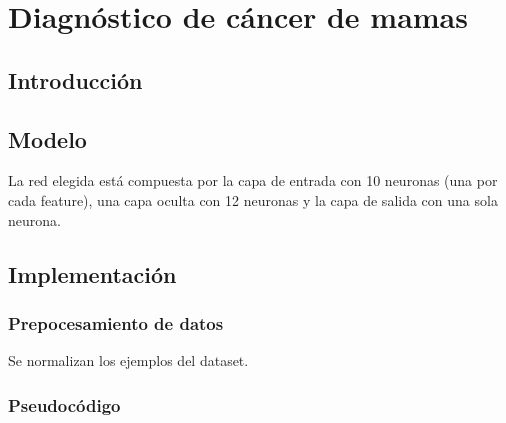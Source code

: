 \section{Diagnóstico de cáncer de mamas}


\subsection{Introducción}


\subsection{Modelo}

La red elegida está compuesta por la capa de entrada con 10 neuronas (una por cada feature), una capa oculta con 12 neuronas y la capa de salida con una sola neurona. 


\subsection{Implementación}


\subsubsection{Prepocesamiento de datos}

Se normalizan los ejemplos del dataset.


\subsubsection{Pseudocódigo}

